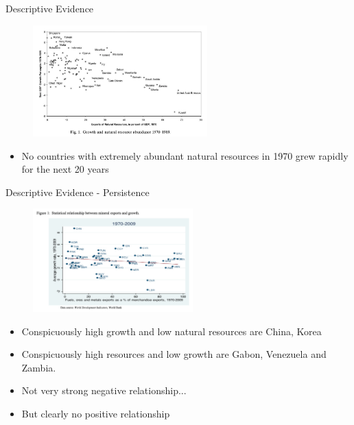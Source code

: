 \documentclass[11pt,notes=hide,aspectratio=169,mathserif]{beamer}
\begin{document}
\begin{frame}{Descriptive Evidence}
\begin{figure}
\centering
\includegraphics[width=0.6\textwidth]{../TA9/inputs/fig1.png}
\end{figure}
\begin{itemize}
\item No countries with extremely abundant natural resources in 1970 grew rapidly for the next 20 years
\end{itemize}
\end{frame}

\begin{frame}{Descriptive Evidence - Persistence}
\begin{figure}
\centering
\includegraphics[width=0.55\textwidth]{../TA9/inputs/fig2.png}
\end{figure}
\begin{itemize}
\item Conspicuously high growth and low natural resources are China, Korea
\pause \item Conspicuously high resources and low growth are Gabon, Venezuela and Zambia. 
\pause \item Not very strong negative relationship...
\pause \item But clearly no positive relationship
\end{itemize}
\end{frame}
\end{document}

